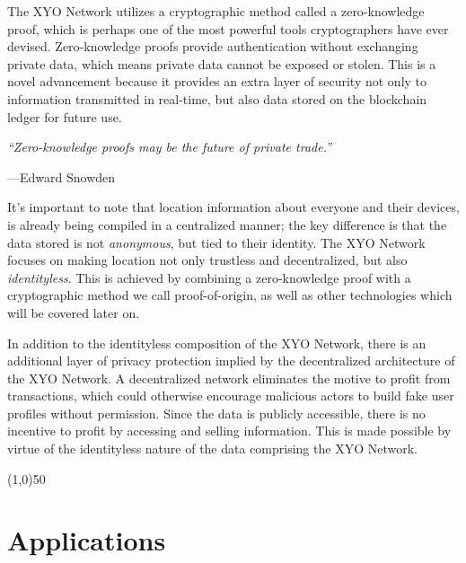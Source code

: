 \documentclass{article}
\begin{document}
The XYO Network utilizes a cryptographic method called a zero-knowledge proof, which is perhaps one of the most powerful tools cryptographers have ever devised. Zero-knowledge proofs provide authentication without exchanging private data, which means private data cannot be exposed or stolen. This is a novel advancement because it provides an extra layer of security not only to information transmitted in real-time, but also data stored on the blockchain ledger for future use.

\begin{displayquote}\textit{``Zero-knowledge proofs may be the future of private trade.''} \cite{snowden-privatetrade}

\vspace{2mm}
---Edward Snowden
\end{displayquote}

It's important to note that location information about everyone and their devices, is already being compiled in a centralized manner; the key difference is that the data stored is not \textit{anonymous}, but tied to their identity. The XYO Network focuses on making location not only \gls{trustless} and decentralized, but also \textit{identityless}. This is achieved by combining a zero-knowledge proof with a cryptographic method we call \Gls{proof-of-origin}, as well as other technologies which will be covered later on.

In addition to the identityless composition of the XYO Network, there is an additional layer of privacy protection implied by the decentralized architecture of the XYO Network. A decentralized network eliminates the motive to profit from transactions, which could otherwise encourage malicious actors to build fake user profiles without permission. Since the data is publicly accessible, there is no incentive to profit by accessing and selling information. This is made possible by virtue of the identityless nature of the data comprising the XYO Network.

\begin{center}
\line(1,0){50}
\end{center}

\section{Applications}
\end{document}
